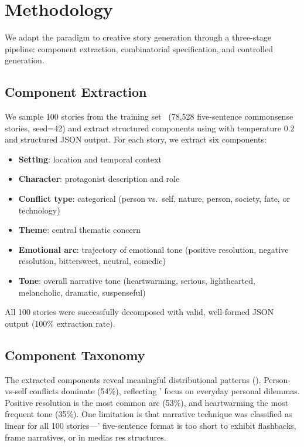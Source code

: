 \section{Methodology}
\label{sec:method}

We adapt the \skillmix paradigm to creative story generation through a three-stage pipeline: component extraction, combinatorial specification, and controlled generation.

\subsection{Component Extraction}
\label{sec:extraction}

We sample 100 stories from the \rocstories training set~\cite{mostafazadeh2016corpus} (78,528 five-sentence commonsense stories, seed=42) and extract structured components using \gptfour with temperature 0.2 and structured JSON output.
For each story, we extract six components:

\begin{itemize}[leftmargin=*,itemsep=0pt,topsep=0pt]
    \item \textbf{Setting}: location and temporal context
    \item \textbf{Character}: protagonist description and role
    \item \textbf{Conflict type}: categorical (person vs.\ self, nature, person, society, fate, or technology)
    \item \textbf{Theme}: central thematic concern
    \item \textbf{Emotional arc}: trajectory of emotional tone (positive resolution, negative resolution, bittersweet, neutral, comedic)
    \item \textbf{Tone}: overall narrative tone (heartwarming, serious, lighthearted, melancholic, dramatic, suspenseful)
\end{itemize}

All 100 stories were successfully decomposed with valid, well-formed JSON output (100\% extraction rate).

\subsection{Component Taxonomy}
\label{sec:taxonomy}

The extracted components reveal meaningful distributional patterns ().
Person-vs-self conflicts dominate (54\%), reflecting \rocstories' focus on everyday personal dilemmas.
Positive resolution is the most common arc (53\%), and heartwarming the most frequent tone (35\%).
One limitation is that narrative technique was classified as linear for all 100 stories---\rocstories' five-sentence format is too short to exhibit flashbacks, frame narratives, or in medias res structures.

